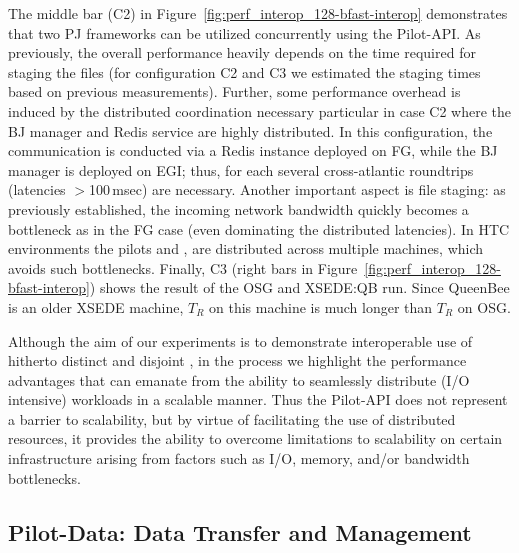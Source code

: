 \documentclass[conference]{IEEEtran}
\begin{document}


The middle bar (C2) in Figure~\ref{fig:perf_interop_128-bfast-interop}
demonstrates that two PJ frameworks can be utilized concurrently using
the Pilot-API. As previously, the overall performance heavily depends
on the time required for staging the files (for configuration C2 and
C3 we estimated the staging times based on previous
measurements). Further, some performance overhead is induced by the
distributed coordination necessary particular in case C2 where the BJ
manager and Redis service are highly distributed. In this
configuration, the communication is conducted via a Redis instance
deployed on FG, while the BJ manager is deployed on EGI; thus, for
each \cu several cross-atlantic roundtrips (latencies $>$100\,msec)
are necessary. Another important aspect is file staging: as previously
established, the incoming network bandwidth quickly becomes a
bottleneck as in the FG case (even dominating the distributed
latencies). In HTC environments the pilots and 
\cus, are distributed across multiple machines, which avoids such
bottlenecks.  Finally, C3 (right bars in
Figure~\ref{fig:perf_interop_128-bfast-interop}) shows the result of
the OSG and XSEDE:QB run. Since QueenBee is an older XSEDE machine,
$T_R$ on this machine is much longer than $T_R$ on OSG.


Although the aim of our experiments is to demonstrate interoperable
use of hitherto distinct and disjoint \pilotjobs, in the process we
highlight the performance advantages that can emanate from the ability
to seamlessly distribute (I/O intensive) workloads in a scalable
manner. Thus the Pilot-API does not represent a barrier to
scalability, but by virtue of facilitating the use of distributed
resources, it provides the ability to overcome limitations to
scalability on certain infrastructure arising from factors such as
I/O, memory, and/or bandwidth bottlenecks. 

\subsection{Pilot-Data: Data Transfer and Management}
\label{sec:experiment-pilotdata}
\end{document}
